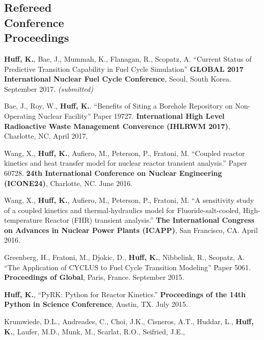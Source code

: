 \documentclass[margin,line]{resume}
\begin{document}
\begin{resume}
    \section{\mysidestyle Refereed\\Conference\\Proceedings}
    \begin{bibenum}
    \item \textbf{Huff, K.}, Bae, J., Mummah, K., Flanagan, R., Scopatz, A.
            ``Current Status of Predictive Transition Capability in Fuel Cycle 
            Simulation'' \textbf{GLOBAL 2017 International Nuclear Fuel Cycle 
            Conference}, Seoul, South Korea. September 2017. \emph{(submitted)}
      \item Bae, J., Roy, W., \textbf{Huff, K.}.
            ``Benefits of Siting a Borehole Repository on Non-Operating Nuclear 
            Facility'' Paper 19727.  \textbf{International High Level Radioactive 
            Waste Management Converence (IHLRWM 2017)},
            Charlotte, NC. April 2017. 
      \item Wang, X., \textbf{Huff, K.}, Aufiero, M., Peterson, P., Fratoni, M.
            ``Coupled reactor kinetics and heat transfer model for nuclear 
            reactor transient analysis.'' Paper 60728.  \textbf{24th 
            International Conference on Nuclear Engineering (ICONE24)}, 
            Charlotte, NC.  June 2016. 
      \item Wang, X., \textbf{Huff, K.}, Aufiero, M., Peterson, P., Fratoni, M.
            ``A sensitivity study of a coupled kinetics and thermal-hydraulics 
            model for Fluoride-salt-cooled, High-temperature Reactor (FHR) 
            transient analysis.'' \textbf{The International 
            Congress on Advances in Nuclear Power Plants (ICAPP)}, San 
            Francisco, CA. April 2016.
      \item Greenberg, H., Fratoni, M., Djokic, D., \textbf{Huff, K.},
         Nibbelink, R., Scopatz, A. ``The Application of CYCLUS to Fuel Cycle
         Transition Modeling'' Paper 5061.
         \textbf{Proceedings of Global}, Paris, France. September 2015.
      \item \textbf{Huff, K.}, ``PyRK: Python for Reactor Kinetics.''
         \textbf{Proceedings of the 14th Python in Science Conference}, Austin,
         TX. July 2015.
      \item Krumwiede, D.L., Andreades, C., Choi, J.K., Cisneros, A.T., Huddar, L.,
         \textbf{Huff, K.}, Laufer, M.D., Munk, M., Scarlat, R.O., Seifried, J.E.,

\end{bibenum}
\end{resume}
\end{document}
